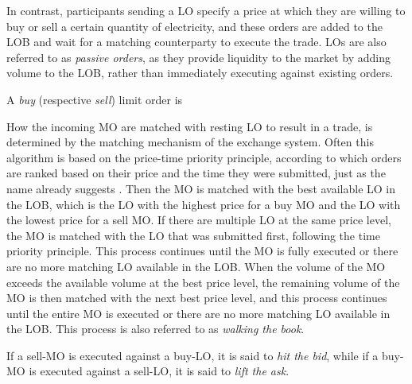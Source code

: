 \documentclass[12pt,a4paper]{cau_thesis}
\begin{document}
In contrast, participants sending a LO specify a price at which they
are willing to buy or sell a certain quantity of electricity, and
these orders are added to the LOB and wait for a matching
counterparty to execute the trade. LOs are also referred to as
\textit{passive orders}, as they provide liquidity to the market by
adding volume to the LOB, rather than immediately executing against
existing orders.

\begin{definition}
    A \textit{buy} (respective \textit{sell}) limit order is
    \label{def:limit_order}
\end{definition}

How the incoming MO are matched with resting LO to result in a trade,
is determined by the matching mechanism of the exchange system. Often
this algorithm is based on the price-time priority principle,
according to which orders are ranked based on their price and the
time they were submitted, just as the name already suggests
\cite{cartea2015algorithmic}. Then the MO is matched with the best
available LO in the LOB, which is the LO with the highest price for a
buy MO and the LO with the lowest price for a sell MO. If there are
multiple LO at the same price level, the MO is matched with the LO
that was submitted first, following the time priority principle. This
process continues until the MO is fully executed or there are no more
matching LO available in the LOB. When the volume of the MO exceeds
the available volume at the best price level, the remaining volume of
the MO is then matched with the next best price level, and this
process continues until the entire MO is executed or there are no
more matching LO available in the LOB. This process is also referred
to as \textit{walking the book}.

If a sell-MO is executed against a buy-LO, it is said to \textit{hit
    the bid}, while if a buy-MO is executed against a sell-LO, it is said
to \textit{lift the ask}.
\end{document}
